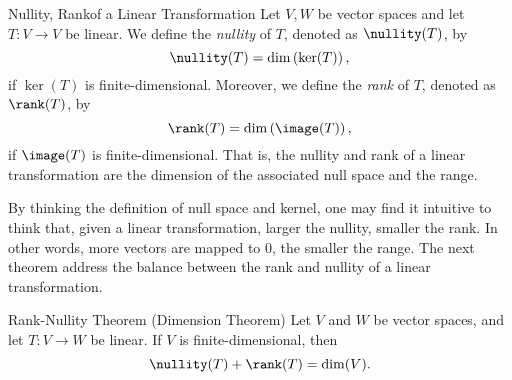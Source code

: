 \documentclass[linearalgebra]{subfiles}
\begin{document}
    \begin{definition}{Nullity, Rank}{of a Linear Transformation}
        Let $V, W$ be vector spaces and let $T:V\to V$ be linear. We define the \emph{nullity} of $T$, denoted as $\nullity(T)$, by
        \begin{equation*}
            \nullity(T) = \dim\left( \ker(T) \right),
        \end{equation*}
        if $\ker(T)$ is finite-dimensional. Moreover, we define the \emph{rank} of $T$, denoted as $\rank(T)$, by
        \begin{equation*}
            \rank(T) = \dim\left( \image(T) \right),
        \end{equation*}
        if $\image(T)$ is finite-dimensional. That is, the nullity and rank of a linear transformation are the dimension of the associated null space and the range.
    \end{definition}

    \begin{remark}
        By thinking the definition of null space and kernel, one may find it intuitive to think that, given a linear transformation, larger the nullity, smaller the rank. In other words, more vectors are mapped to 0, the smaller the range. The next theorem address the balance between the rank and nullity of a linear transformation.
    \end{remark}

    \begin{theorem}{Rank-Nullity Theorem (Dimension Theorem)}
        Let $V$ and $W$ be vector spaces, and let $T: V\to W$ be linear. If $V$ is finite-dimensional, then
        \begin{equation*}
            \nullity(T) + \rank(T) = \dim(V).
        \end{equation*}
    \end{theorem}
\end{document}
